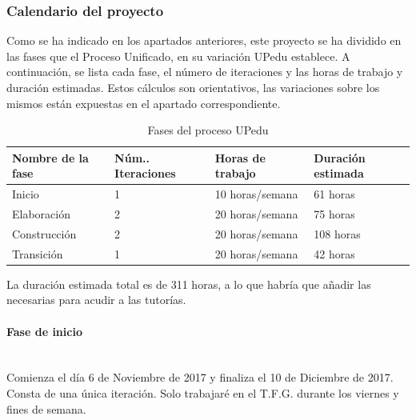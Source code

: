 \documentclass[twoside]{report}
\begin{document}
\subsubsection{Calendario del proyecto}

Como se ha indicado en los apartados anteriores, este proyecto se ha dividido en las fases que el Proceso Unificado, en su variación UPedu\cite{upedu} establece. A continuación, se lista cada fase, el número de iteraciones y las horas de trabajo y duración estimadas. Estos cálculos son orientativos, las variaciones sobre los mismos están expuestas en el apartado correspondiente.

\begin{table}[H]
\centering
\begin{tabular}{|l|l|l|l|}
\hline
Nombre de la fase & Núm.. Iteraciones & Horas de trabajo & Duración estimada \\ \hline
Inicio            & 1                 & 10 horas/semana  & 61 horas       \\ \hline
Elaboración       & 2                 & 20 horas/semana  & 75 horas    \\ \hline
Construcción      & 2                 & 20 horas/semana  & 108 horas       \\ \hline
Transición        & 1                 & 20 horas/semana   & 42 horas       \\ \hline
\end{tabular}
\caption{Fases del proceso UPedu}
\end{table}

La duración estimada total es de 311 horas, a lo que habría que añadir las necesarias para acudir a las tutorías.

\paragraph{Fase de inicio}\mbox{}\\

Comienza el día 6 de Noviembre de 2017 y finaliza el 10 de Diciembre de 2017. Consta de una única iteración. Solo trabajaré en el T.F.G. durante los viernes y fines de semana.
\end{document}

